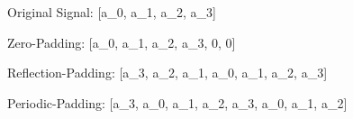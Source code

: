 Original Signal: [a_0, a_1, a_2, a_3]

Zero-Padding: [a_0, a_1, a_2, a_3, 0, 0]

Reflection-Padding: [a_3, a_2, a_1, a_0, a_1, a_2, a_3]

Periodic-Padding: [a_3, a_0, a_1, a_2, a_3, a_0, a_1, a_2]